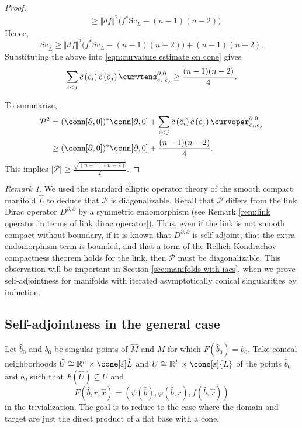 \documentclass[12pt, reqno]{amsart}
\theoremstyle{plain} %
\theoremstyle{definition}
\theoremstyle{remark}
\newtheorem{remark}[theorem]{Remark}
\numberwithin{equation}{section}
\newcommand{\dom}[1]{\hat{#1}}
\newcommand{\onorm}[1]{\Vert #1 \Vert}
\newcommand{\cbar}[1]{\dom{c}\left(#1\right)}
\newcommand{\field}[1]{\mathbb{#1}}
\newcommand{\abs}[1]{\lvert #1 \rvert}
\newcommand{\R}{\field{R}}
\newcommand{\Sc}{\mathrm{Sc}}
\newcommand{\hdim}{h} %
\begin{document}
\begin{proof}
\begin{align*}
        &\geq \onorm{df}^2 \big(f^*\Sc_L - (n-1)(n-2)\big)
    \end{align*}
    Hence,
    \begin{equation*}
        \Sc_{\dom{L}} \geq \onorm{df}^2 \big(f^*\Sc_L - (n-1)(n-2)\big) + (n-1)(n-2).
    \end{equation*}
    Substituting the above into \eqref{eqn:curvature estimate on cone} gives
    \begin{equation*}
        \sum_{i < j} \cbar{\dom{e}_i} \cbar{\dom{e}_j} \curvtens_{\dom{e}_i, \dom{e}_j}^{\partial, 0} \geq \frac{(n-1)(n-2)}{4}.
    \end{equation*}

    To summarize,
    \begin{align*}
        \mathcal{P}^2 &= (\conn[\partial, 0])^* \conn[\partial, 0] + \sum_{i < j} \cbar{\dom{e}_i} \cbar{\dom{e}_j} \curvoper_{\dom{e}_i, \dom{e}_j}^{\partial, 0} \\
        &\geq (\conn[\partial, 0])^* \conn[\partial, 0] + \frac{(n-1)(n-2)}{4}.
    \end{align*}
    This implies \(\abs{\mathcal{P}} \geq \frac{\sqrt{(n-1)(n-2)}}{2}\).
\end{proof}
\begin{remark}\label{rem:enough to know link dirac operator is Fredholm}
    We used the standard elliptic operator theory of the smooth compact manifold \(\dom{L}\) to deduce that \(\mathcal{P}\) is diagonalizable.
    Recall that \(\mathcal{P}\) differs from the link Dirac operator \(D^{\partial, \partial}\) by a symmetric endomorphism (see Remark \ref{rem:link operator in terms of link dirac operator}).
    Thus, even if the link is not smooth compact without boundary, if it is known that \(D^{\partial, \partial}\) is self-adjoint, that the extra endomorphism term is bounded, and that a form of the Rellich-Kondrachov compactness theorem holds for the link, then \(\mathcal{P}\) must be diagonalizable.
    This observation will be important in Section \ref{sec:manifolds with iacs}, when we prove self-adjointness for manifolds with iterated asymptotically conical singularities by induction.
\end{remark}
\subsection{Self-adjointness in the general case}\label{subsec:self-adjointness in general case - facs manifolds}
Let \(\dom{b}_0\) and \(b_0\) be singular points of \(\dom{M}\) and \(M\) for which \(F(\dom{b}_0) = b_0\).
Take conical neighborhoods \(\dom{U} \cong \R^\hdim \times \cone[\dom{\varepsilon}]{\dom{L}}\) and \(U \cong \R^\hdim \times \cone[\varepsilon]{L}\) of the points \(\dom{b}_0\) and \(b_0\) such that \(F(\dom{U}) \subseteq U\) and
\begin{equation*}
    F(\dom{b},r,\dom{x}) = (\psi(\dom{b}), \varphi(\dom{b},r), f(\dom{b},\dom{x}))
\end{equation*}
in the trivialization.
The goal is to reduce to the case where the domain and target are just the direct product of a flat base with a cone.
\end{document}
